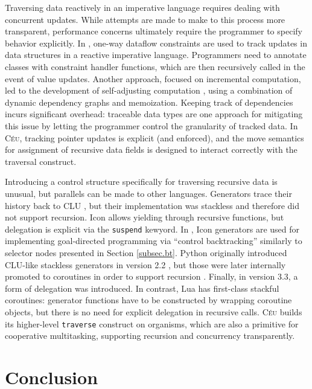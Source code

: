 \documentclass{sig-alternate}
\newcommand{\CEU}{\textsc{C\'{e}u}\xspace}
\newcommand{\code}[1] {{\small{\texttt{#1}}}}
\begin{document}
Traversing data reactively in an imperative language requires
dealing with concurrent updates. While attempts are made to make to this
process more transparent, performance concerns ultimately require the
programmer to specify behavior explicitly. In \cite{ripdataflow}, one-way
dataflow constraints are used to track updates in data structures in a
reactive imperative language. Programmers need to annotate classes with
constraint handler functions, which are then recursively called in the event
of value updates. Another approach, focused on incremental computation, led to
the development of self-adjusting computation \cite{selfadjusting}, using a
combination of dynamic dependency graphs and memoization. Keeping track of
dependencies incurs significant overhead: traceable data types
\cite{traceable} are one approach for mitigating this issue by letting the
programmer control the granularity of tracked data. In \CEU, tracking pointer
updates is explicit (and enforced), and the move semantics for assignment of
recursive data fields is designed to interact correctly with the traversal
construct.

Introducing a control structure specifically for traversing recursive data is
unusual, but parallels can be made to other languages. Generators trace their
history back to CLU \cite{clu}, but their implementation was stackless and
therefore did not support recursion. Icon \cite{icon} allows yielding through
recursive functions, but delegation is explicit via the \code{suspend}
kewyord. In \cite{icon}, Icon generators are used for implementing
goal-directed programming via ``control backtracking'' similarly to selector
nodes presented in Section \ref{subsec.bt}. Python originally
introduced CLU-like stackless generators in version 2.2 \cite{pep255}, but
those were later internally promoted to coroutines in order to support
recursion \cite{pep342}. Finally, in version 3.3, a form of delegation was
introduced. In contrast, Lua \cite{lua} has first-class stackful coroutines:
generator functions have to be constructed by wrapping coroutine objects, but
there is no need for explicit delegation in recursive calls. \CEU builds its
higher-level \code{traverse} construct on organisms, which are also a primitive
for cooperative multitasking, supporting recursion and concurrency
transparently.

\section{Conclusion}
\label{sec.conclusion}
\end{document}
